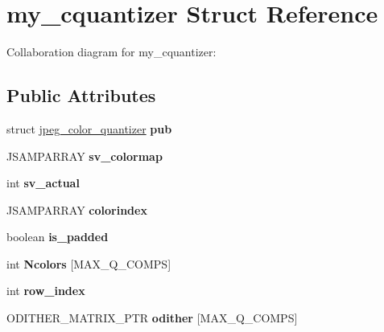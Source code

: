 \hypertarget{structmy__cquantizer}{\section{my\+\_\+cquantizer Struct Reference}
\label{structmy__cquantizer}
}


Collaboration diagram for my\+\_\+cquantizer\+:
\subsection*{Public Attributes}
\begin{DoxyCompactItemize}
\item 
\hypertarget{structmy__cquantizer_a81f2eb75e01985369a162d52f5086409}{struct \hyperlink{structjpeg__color__quantizer}{jpeg\+\_\+color\+\_\+quantizer} {\bfseries pub}}\label{structmy__cquantizer_a81f2eb75e01985369a162d52f5086409}

\item 
\hypertarget{structmy__cquantizer_a9d0cd4d81691db3ec5f01e68fe6537bd}{J\+S\+A\+M\+P\+A\+R\+R\+A\+Y {\bfseries sv\+\_\+colormap}}\label{structmy__cquantizer_a9d0cd4d81691db3ec5f01e68fe6537bd}

\item 
\hypertarget{structmy__cquantizer_a9fcddbecf01942c4976e271de23effd5}{int {\bfseries sv\+\_\+actual}}\label{structmy__cquantizer_a9fcddbecf01942c4976e271de23effd5}

\item 
\hypertarget{structmy__cquantizer_a7ec499ccdb9c6983c14edc40453ac1ed}{J\+S\+A\+M\+P\+A\+R\+R\+A\+Y {\bfseries colorindex}}\label{structmy__cquantizer_a7ec499ccdb9c6983c14edc40453ac1ed}

\item 
\hypertarget{structmy__cquantizer_abd8e895b22508f002cab06b54c4ee64c}{boolean {\bfseries is\+\_\+padded}}\label{structmy__cquantizer_abd8e895b22508f002cab06b54c4ee64c}

\item 
\hypertarget{structmy__cquantizer_a6b3c0905a888bd09ee2b8561ad8524c8}{int {\bfseries Ncolors} \mbox{[}M\+A\+X\+\_\+\+Q\+\_\+\+C\+O\+M\+P\+S\mbox{]}}\label{structmy__cquantizer_a6b3c0905a888bd09ee2b8561ad8524c8}

\item 
\hypertarget{structmy__cquantizer_a0f10920c096845b912925a98019afc62}{int {\bfseries row\+\_\+index}}\label{structmy__cquantizer_a0f10920c096845b912925a98019afc62}

\item 
\hypertarget{structmy__cquantizer_aaa7e366ab4998e891762cc56f4ada754}{O\+D\+I\+T\+H\+E\+R\+\_\+\+M\+A\+T\+R\+I\+X\+\_\+\+P\+T\+R {\bfseries odither} \mbox{[}M\+A\+X\+\_\+\+Q\+\_\+\+C\+O\+M\+P\+S\mbox{]}}\label{structmy__cquantizer_aaa7e366ab4998e891762cc56f4ada754}


\end{DoxyCompactItemize}
